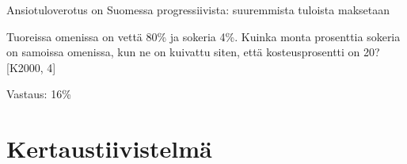 Ansiotuloverotus on Suomessa progressiivista: suuremmista tuloista maksetaan

\begin{tehtava}
Tuoreissa omenissa on vettä 80\% ja sokeria 4\%. Kuinka monta prosenttia sokeria on samoissa omenissa, kun ne on kuivattu siten, että kosteusprosentti on 20? [K2000, 4]
\begin{vastaus}
Vastaus: 16\%
\end{vastaus}
\end{tehtava}

%
%
\chapter{Kertaustiivistelmä}
